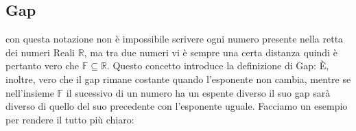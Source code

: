 \subsection{Gap}
con questa notazione non è impossibile scrivere ogni numero presente nella retta dei numeri Reali $\mathbb{R}$, ma tra due numeri vi è sempre una certa distanza quindi è pertanto vero che $\mathbb{F}\subseteq \mathbb{R}$. Questo concetto introduce la definizione di Gap:
È, inoltre, vero che il gap rimane costante quando l'esponente non cambia, mentre se nell'insieme $\mathbb{F}$ il sucessivo di un numero ha un espente diverso il suo gap sarà diverso di quello del suo precedente con l'esponente uguale. Facciamo un esempio per rendere il tutto più chiaro:
